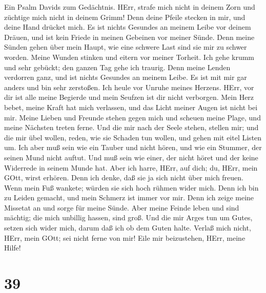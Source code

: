  Ein Psalm Davids zum Gedächtnis.  HErr, strafe
mich nicht in deinem Zorn und züchtige mich nicht in deinem Grimm!
 Denn deine Pfeile stecken in mir, und deine Hand drücket
mich.  Es ist nichts Gesundes an meinem Leibe vor deinem
Dräuen, und ist kein Friede in meinen Gebeinen vor meiner Sünde.
 Denn meine Sünden gehen über mein Haupt, wie eine schwere
Last sind sie mir zu schwer worden.  Meine Wunden stinken
und eitern vor meiner Torheit.  Ich gehe krumm und sehr
gebückt; den ganzen Tag gehe ich traurig.  Denn meine Lenden
verdorren ganz, und ist nichts Gesundes an meinem Leibe.  Es
ist mit mir gar anders und bin sehr zerstoßen. Ich heule vor Unruhe
meines Herzens.  HErr, vor dir ist alle meine Begierde und
mein Seufzen ist dir nicht verborgen.  Mein Herz bebet,
meine Kraft hat mich verlassen, und das Licht meiner Augen ist nicht bei
mir.  Meine Lieben und Freunde stehen gegen mich und
scheuen meine Plage, und meine Nächsten treten ferne.  Und
die mir nach der Seele stehen, stellen mir; und die mir übel wollen,
reden, wie sie Schaden tun wollen, und gehen mit eitel Listen um.
 Ich aber muß sein wie ein Tauber und nicht hören, und wie
ein Stummer, der seinen Mund nicht auftut.  Und muß sein
wie einer, der nicht höret und der keine Widerrede in seinem Munde hat.
 Aber ich harre, HErr, auf dich; du, HErr, mein GOtt, wirst
erhören.  Denn ich denke, daß sie ja sich nicht über mich
freuen. Wenn mein Fuß wankete; würden sie sich hoch rühmen wider mich.
 Denn ich bin zu Leiden gemacht, und mein Schmerz ist immer
vor mir.  Denn ich zeige meine Missetat an und sorge für
meine Sünde.  Aber meine Feinde leben und sind mächtig; die
mich unbillig hassen, sind groß.  Und die mir Arges tun um
Gutes, setzen sich wider mich, darum daß ich ob dem Guten halte.
 Verlaß mich nicht, HErr, mein GOtt; sei nicht ferne von
mir!  Eile mir beizustehen, HErr, meine Hilfe!

\hypertarget{section-38}{%
\section{39}\label{section-38}}

